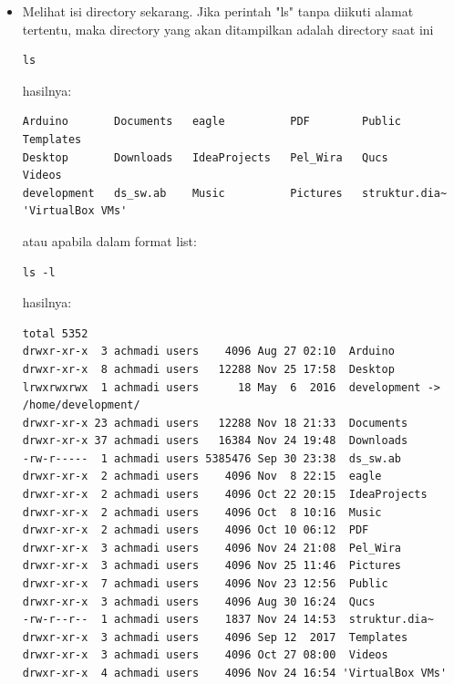 \documentclass[12pt,]{article}
\begin{document}
\begin{itemize}
\begin{itemize}
			\item Melihat isi directory sekarang. Jika perintah "ls" tanpa diikuti alamat tertentu, maka directory yang akan ditampilkan adalah directory saat ini
			\begin{verbatim}
ls
			\end{verbatim}
			hasilnya:
			\begin{verbatim}
Arduino       Documents   eagle          PDF        Public          Templates
Desktop       Downloads   IdeaProjects   Pel_Wira   Qucs            Videos
development   ds_sw.ab    Music          Pictures   struktur.dia~  'VirtualBox VMs'
			\end{verbatim}
			atau apabila dalam format list:
			\begin{verbatim}
ls -l
			\end{verbatim}
			hasilnya:	
			\begin{verbatim}
total 5352
drwxr-xr-x  3 achmadi users    4096 Aug 27 02:10  Arduino
drwxr-xr-x  8 achmadi users   12288 Nov 25 17:58  Desktop
lrwxrwxrwx  1 achmadi users      18 May  6  2016  development -> /home/development/
drwxr-xr-x 23 achmadi users   12288 Nov 18 21:33  Documents
drwxr-xr-x 37 achmadi users   16384 Nov 24 19:48  Downloads
-rw-r-----  1 achmadi users 5385476 Sep 30 23:38  ds_sw.ab
drwxr-xr-x  2 achmadi users    4096 Nov  8 22:15  eagle
drwxr-xr-x  2 achmadi users    4096 Oct 22 20:15  IdeaProjects
drwxr-xr-x  2 achmadi users    4096 Oct  8 10:16  Music
drwxr-xr-x  2 achmadi users    4096 Oct 10 06:12  PDF
drwxr-xr-x  3 achmadi users    4096 Nov 24 21:08  Pel_Wira
drwxr-xr-x  3 achmadi users    4096 Nov 25 11:46  Pictures
drwxr-xr-x  7 achmadi users    4096 Nov 23 12:56  Public
drwxr-xr-x  3 achmadi users    4096 Aug 30 16:24  Qucs
-rw-r--r--  1 achmadi users    1837 Nov 24 14:53  struktur.dia~
drwxr-xr-x  3 achmadi users    4096 Sep 12  2017  Templates
drwxr-xr-x  3 achmadi users    4096 Oct 27 08:00  Videos
drwxr-xr-x  4 achmadi users    4096 Nov 24 16:54 'VirtualBox VMs'
			\end{verbatim}
			

\end{itemize}
\end{itemize}
\end{document}
